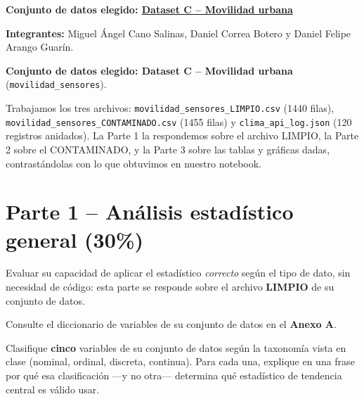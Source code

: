 \documentclass[11pt]{article}
\begin{document}
\noindent\textbf{Conjunto de datos elegido: \underline{Dataset C -- Movilidad urbana}}

\vspace{0.3em}
\begin{respuesta}
\textbf{Integrantes:} Miguel Ángel Cano Salinas, Daniel Correa Botero y Daniel Felipe Arango Guarín.

\medskip
\textbf{Conjunto de datos elegido: Dataset C -- Movilidad urbana} (\texttt{movilidad\_sensores}).

Trabajamos los tres archivos: \texttt{movilidad\_sensores\_LIMPIO.csv} (1440 filas), \texttt{movilidad\_sensores\_CONTAMINADO.csv} (1455 filas) y \texttt{clima\_api\_log.json} (120 registros anidados). La Parte 1 la respondemos sobre el archivo LIMPIO, la Parte 2 sobre el CONTAMINADO, y la Parte 3 sobre las tablas y gráficas dadas, contrastándolas con lo que obtuvimos en nuestro notebook.
\end{respuesta}


\section{Parte 1 -- Análisis estadístico general (30\%)}
\begin{contexto}
Evaluar su capacidad de aplicar el estadístico \emph{correcto} según el tipo de dato, sin necesidad de código: esta parte se responde sobre el archivo \textbf{LIMPIO} de su conjunto de datos.
\end{contexto}

\noindent Consulte el diccionario de variables de su conjunto de datos en el \textbf{Anexo A}.

\begin{pregunta}
Clasifique \textbf{cinco} variables de su conjunto de datos según la taxonomía vista en clase (nominal, ordinal, discreta, continua). Para cada una, explique en una frase por qué esa clasificación —y no otra— determina qué estadístico de tendencia central es válido usar.
\end{pregunta}
\end{document}
